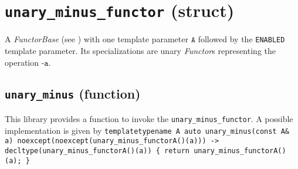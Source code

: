 %
%
%
%
%
%
%

\section{\texttt{unary\_minus\_functor} (struct)}
A \textit{FunctorBase} (see \cite{functors}) with one template parameter $\texttt{A}$ followed by the \texttt{ENABLED} template parameter.
Its specializations are unary \textit{Functor}s representing the operation $\texttt{-a}$.

\subsection{\texttt{unary\_minus} (function)}
This library provides a function to invoke the \texttt{unary\_minus\_functor}.
A possible implementation is given by\newline
\texttt{template\textlangle typename A\textrangle\newline
auto\newline
unary\_minus(const A\& a)\newline
noexcept(noexcept(unary\_minus\_functor\textlangle A\textrangle()(a)))\newline
-> decltype(unary\_minus\_functor\textlangle A\textrangle()(a))\newline
\{ return unary\_minus\_functor\textlangle A\textrangle()(a); \}}

